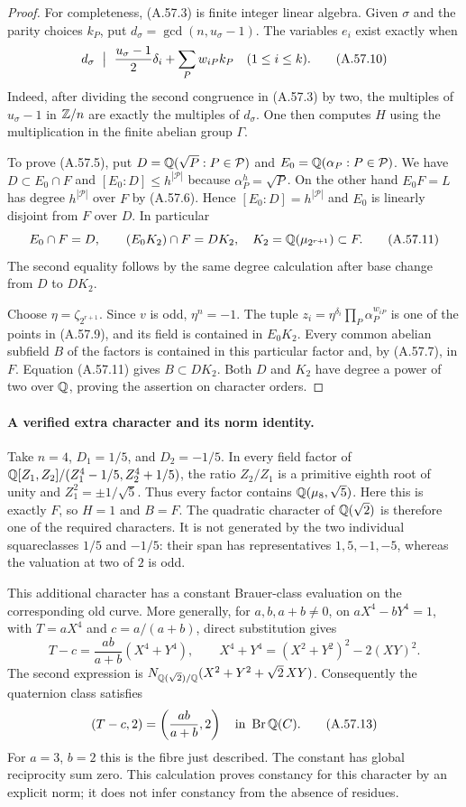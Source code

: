 \begin{proof}
For completeness, (A.57.3) is finite integer
linear algebra. Given $\sigma$ and the parity
choices $k_P$, put $d_\sigma=\gcd(n,u_\sigma-1)$.
The variables $e_i$ exist exactly when
\[
 d_\sigma\ \bigm|\ 
       \frac{u_\sigma-1}{2}\delta_i+\sum_Pw_{iP}k_P
                    \quad(1\le i\le k).
 \tag{A.57.10}
\]
Indeed, after dividing the second congruence in
(A.57.3) by two, the multiples of $u_\sigma-1$
in $\mathbb Z/n$ are exactly the multiples of $d_\sigma$.
One then computes $H$ using the multiplication
in the finite abelian group $\Gamma$.

To prove (A.57.5), put
$D=\mathbb Q(\sqrt P:P\in\mathcal P)$ and
$E_0=\mathbb Q(\alpha_P:P\in\mathcal P)$.
We have $D\subset E_0\cap F$ and
$[E_0:D]\le h^{|\mathcal P|}$ because
$\alpha_P^h=\sqrt P$.
On the other hand $E_0F=L$ has degree
$h^{|\mathcal P|}$ over $F$ by (A.57.6).
Hence $[E_0:D]=h^{|\mathcal P|}$ and $E_0$
is linearly disjoint from $F$ over $D$.
In particular
\[
 E_0\cap F=D,\qquad
 (E_0K_2)\cap F=DK_2,\quad
 K_2=\mathbb Q(\mu_{2^{r+1}})\subset F.
 \tag{A.57.11}
\]
The second equality follows by the same degree
calculation after base change from $D$ to $DK_2$.

Choose $\eta=\zeta_{2^{r+1}}$. Since $v$ is odd,
$\eta^n=-1$. The tuple
$z_i=\eta^{\delta_i}\prod_P\alpha_P^{w_{iP}}$
is one of the points in (A.57.9), and its field
is contained in $E_0K_2$. Every common abelian
subfield $B$ of the factors is contained in this
particular factor and, by (A.57.7), in $F$.
Equation (A.57.11) gives $B\subset DK_2$.
Both $D$ and $K_2$ have degree a power of two
over $\mathbb Q$, proving the assertion on character orders.
\end{proof}

\paragraph{A verified extra character and its norm identity.}
Take $n=4$, $D_1=1/5$, and $D_2=-1/5$.
In every field factor of
$\mathbb Q[Z_1,Z_2]/(Z_1^4-1/5,Z_2^4+1/5)$,
the ratio $Z_2/Z_1$ is a primitive eighth root
of unity and $Z_1^2=\pm1/\sqrt5$. Thus
every factor contains $\mathbb Q(\mu_8,\sqrt5)$.
Here this is exactly $F$, so $H=1$ and
$B=F$. The quadratic character of $\mathbb Q(\sqrt2)$
is therefore one of the required characters.
It is not generated by the two individual
squareclasses $1/5$ and $-1/5$:
their span has representatives $1,5,-1,-5$,
whereas the valuation at two of $2$ is odd.

This additional character has a constant
Brauer-class evaluation on the corresponding
old curve. More generally, for $a,b,a+b\ne0$, on
$aX^4-bY^4=1$, with $T=aX^4$ and $c=a/(a+b)$,
direct substitution gives
\[
 T-c=\frac{ab}{a+b}(X^4+Y^4),\qquad
 X^4+Y^4=(X^2+Y^2)^2-2(XY)^2.
 \tag{A.57.12}
\]
The second expression is
$N_{\mathbb Q(\sqrt2)/\mathbb Q}(X^2+Y^2+\sqrt2\,XY)$.
Consequently the quaternion class satisfies
\[
                    (T-c,2)=\left(\frac{ab}{a+b},2\right)
                         \quad\text{in }\operatorname{Br}\mathbb Q(C).
 \tag{A.57.13}
\]
For $a=3$, $b=2$ this is the fibre just described.
The constant has global reciprocity sum zero.
This calculation proves constancy for this
character by an explicit norm; it does not infer
constancy from the absence of residues.

